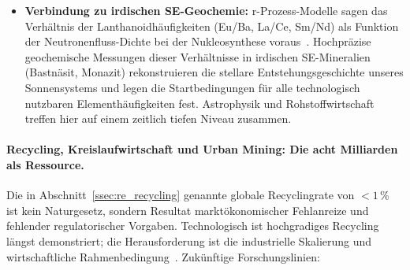 ﻿\documentclass[12pt, a4paper]{report}
\theoremstyle{definition}
\theoremstyle{remark}
\begin{document}
\begin{itemize}
  \item \textbf{Verbindung zu irdischen SE-Geochemie:}
    r-Prozess-Modelle sagen das Verhältnis der Lanthanoidhäufigkeiten
    (Eu/Ba, La/Ce, Sm/Nd) als Funktion der Neutronenfluss-Dichte bei der
    Nukleosynthese voraus~\cite{thielemann2017}. Hochpräzise geochemische
    Messungen dieser Verhältnisse in irdischen SE-Mineralien
    (Bastnäsit, Monazit) rekonstruieren die stellare Entstehungsgeschichte
    unseres Sonnensystems und legen die Startbedingungen für alle technologisch
    nutzbaren Elementhäufigkeiten fest. Astrophysik und Rohstoffwirtschaft
    treffen hier auf einem zeitlich tiefen Niveau zusammen.
\end{itemize}

\paragraph{Recycling, Kreislaufwirtschaft und Urban Mining: Die acht
Milliarden als Ressource.}
Die in Abschnitt~\ref{ssec:re_recycling} genannte globale Recyclingrate von
$< 1\,\%$~\cite{weng2015} ist kein Naturgesetz, sondern Resultat marktökonomischer
Fehlanreize und fehlender regulatorischer Vorgaben. Technologisch ist
hochgradiges Recycling längst demonstriert; die Herausforderung ist die
industrielle Skalierung und wirtschaftliche Rahmenbedingung~\cite{binnemans2013}.
Zukünftige Forschungslinien:
\end{document}
